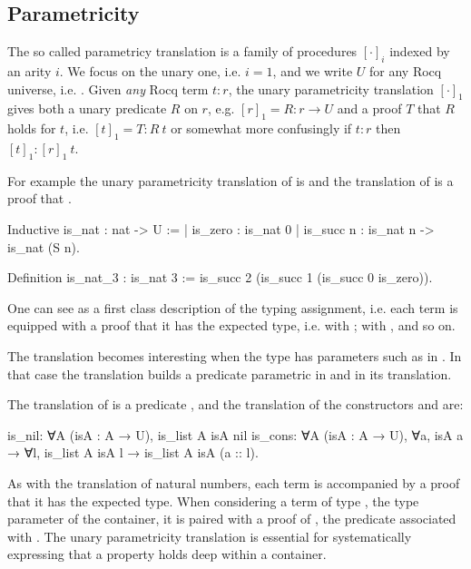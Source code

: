 \documentclass{these-ISSS}
\newenvironment{rocqcode}
  {\VerbatimEnvironment\begin{rocqbox}\begin{xrocqcode}}{\end{xrocqcode}
\end{rocqbox}}
\begin{document}
\subsection{Parametricity}\label{sec:param1}

The so called parametricy translation \cite{keller_et_al:LIPIcs.CSL.2012.381}
is a family of procedures $[\cdot]_i$ indexed by an arity $i$. We focus on the
unary one, i.e. $i=1$, and we write $U$ for any Rocq universe, i.e. .
Given \emph{any} Rocq term $t : r$, the unary parametricity
translation $[\cdot]_1$ gives both a unary predicate $R$ on $r$, e.g. $[r]_1 = R : r \to U$
and a proof $T$ that $R$ holds for $t$, i.e. $[t]_1 = T : R~ t$ or somewhat more
confusingly if $t : r$ then $[t]_1 : [r]_1~ t$.

For example the unary parametricity translation of
 is  and
the translation of  is a proof that .

\begin{rocqcode}
Inductive is_nat : nat -> U :=
| is_zero : is_nat 0
| is_succ n : is_nat n -> is_nat (S n).

Definition is_nat_3 : is_nat 3 :=
  is_succ 2 (is_succ 1 (is_succ 0 is_zero)).
\end{rocqcode}

One can see  as a first class description of the
typing assignment, i.e. each term is equipped with a proof that
it has the expected type, i.e.  with ;
 with , and so on.

The translation becomes interesting when the type has parameters such as
 in . In that case the translation builds
a predicate parametric in  and in its translation.

The translation of  is a predicate
,
and the translation of the constructors  and 
are:

\begin{rocqcode}
is_nil: ∀A (isA : A → U), is_list A isA nil
is_cons: ∀A (isA : A → U), ∀a, isA a → 
  ∀l, is_list A isA l → is_list A isA (a :: l).
\end{rocqcode}


As with the translation of natural numbers, each term is accompanied by a proof
that it has the expected type. When considering a term  of
type , the type parameter of the container, it is paired with a proof of
, the predicate associated with . The unary parametricity
translation is essential for systematically expressing that a property holds deep
within a container.
\end{document}
